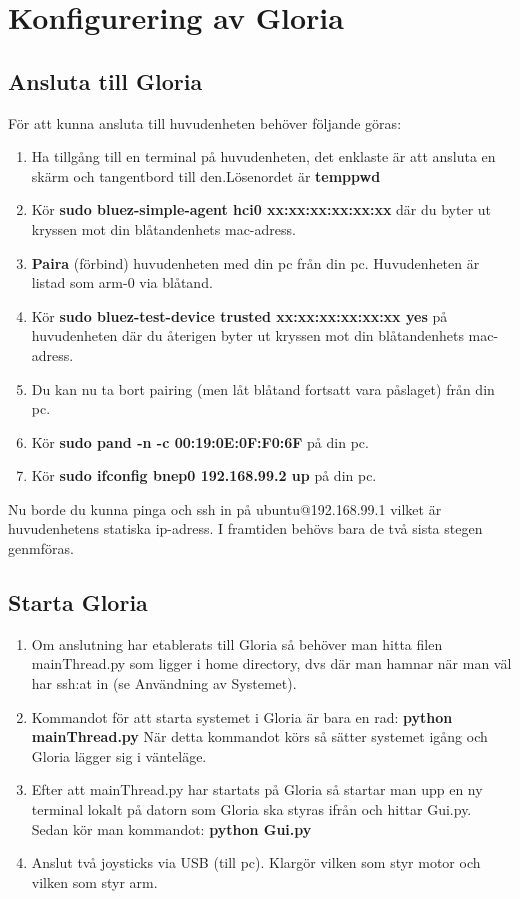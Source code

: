 \section{Konfigurering av Gloria}

\subsection{Ansluta till Gloria}
För att kunna ansluta till huvudenheten behöver följande göras:
\begin{enumerate}
	\item Ha tillgång till en terminal på huvudenheten, det enklaste är att ansluta en skärm och tangentbord till den.\newline Lösenordet är \textbf{temppwd}
	\item Kör \textbf{sudo bluez-simple-agent hci0 xx:xx:xx:xx:xx:xx} där du byter ut kryssen mot din blåtandenhets mac-adress.
	\item \textbf{Paira} (förbind) huvudenheten med din pc från din pc. Huvudenheten är listad som arm-0 via blåtand.
	\item Kör \textbf{sudo bluez-test-device trusted xx:xx:xx:xx:xx:xx yes} på huvudenheten där du återigen byter ut kryssen mot din blåtandenhets mac-adress.
	\item Du kan nu ta bort pairing (men låt blåtand fortsatt vara påslaget) från din pc.
	\item Kör \textbf{sudo pand -n -c 00:19:0E:0F:F0:6F	} på din pc.
	\item Kör \textbf{sudo ifconfig bnep0 192.168.99.2 up } på din pc.
\end{enumerate}
Nu borde du kunna pinga och ssh in på ubuntu@192.168.99.1 vilket är huvudenhetens statiska ip-adress. I framtiden behövs bara de två sista stegen genmföras.
\subsection{Starta Gloria}
\begin{enumerate}
	\item Om anslutning har etablerats till Gloria så behöver man hitta filen mainThread.py som ligger i home directory, dvs där man hamnar när man väl har ssh:at in (se Användning av Systemet).
	\item Kommandot för att starta systemet i Gloria är bara en rad: \textbf{python mainThread.py}
	När detta kommandot körs så sätter systemet igång och Gloria lägger sig i vänteläge.
	\item Efter att mainThread.py har startats på Gloria så startar man upp en ny terminal lokalt på datorn som Gloria ska styras ifrån och hittar Gui.py. Sedan kör man kommandot: \textbf{python Gui.py}
	\item Anslut två joysticks via USB (till pc). Klargör vilken som styr motor och vilken som styr arm.
\end{enumerate}
